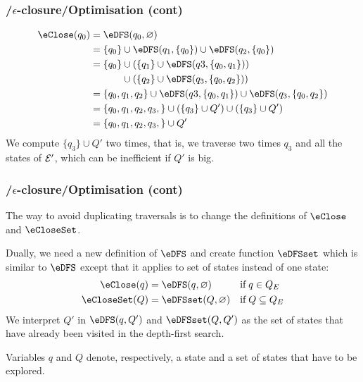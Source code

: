 % 
\begin{frame}
\frametitle{\eNFA{}/\(\epsilon\)-closure/Optimisation (cont)}

\begin{align*}
   \eClose (q_0) 
&= \eDFS (q_0, \varnothing)\\
&= \{q_0\} \cup \eDFS (q_1, \{q_0\}) \cup \eDFS (q_2, \{q_0\})\\
&= \{q_0\} \cup (\{q_1\} \cup \eDFS (q3, \{q_0, q_1\}))\\
&\mathrel{\phantom{=}} \phantom{\{q_0\}}{} \cup (\{q_2\} \cup \eDFS
   (q_3, \{q_0, q_2\}))\\
&= \{q_0, q_1, q_2\} \cup \eDFS (q3, \{q_0, q_1\}) \cup \eDFS
   (q_3, \{q_0, q_2\})\\
&= \{q_0, q_1, q_2, q_3,\} \cup (\{q_3\} \cup Q') \cup (\{q_3\} \cup Q')\\
&= \{q_0, q_1, q_2, q_3,\} \cup Q'
\end{align*}
We compute \(\{q_3\} \cup Q'\) two times, that is, we traverse two
times \(q_3\) and all the states of \(\cal E'\), which can be
inefficient if \(Q'\) is big.

\end{frame}

% 
\begin{frame}
\frametitle{\eNFA{}/\(\epsilon\)-closure/Optimisation (cont)}

The way to avoid duplicating traversals is to change the definitions
of \(\eClose\) and \(\eCloseSet\). 

Dually, we need a new definition of \(\eDFS\) and create function
\(\eDFSset\) which is similar to \(\eDFS\) except that it applies to
set of states instead of one state:
\begin{align*}
   \eClose (q) 
&= \eDFS (q, \varnothing)
&& \text{if} \; q \in Q_E\\
   \eCloseSet (Q)
&= \eDFSset (Q, \varnothing)
&& \text{if} \; Q \subseteq Q_E
\end{align*}
We interpret \(Q'\) in \(\eDFS (q, Q')\) and \(\eDFSset (Q, Q')\) as
the set of states that have already been visited in the depth-first
search.

\bigskip

Variables \(q\) and \(Q\) denote, respectively, a state and a set of
states that have to be explored.

\end{frame}

